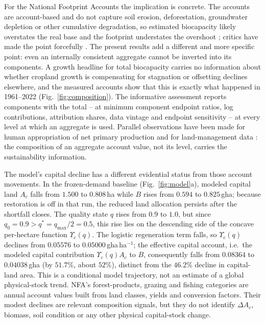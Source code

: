 \documentclass[preprint,12pt,authoryear]{elsarticle}
\newcommand{\Ups}{\Upsilon_c}
\begin{document}
For the National Footprint Accounts the implication is concrete. The accounts are account-based and do not capture soil erosion, deforestation, groundwater depletion or other cumulative degradation, so estimated biocapacity likely overstates the real base and the footprint understates the overshoot \citep{Wackernagel2002,Borucke2013}; critics have made the point forcefully \citep{Blomqvist2013,GiampietroSaltelli2014,Galli2016,vdBerghGrazi2015}. The present results add a different and more specific point: even an internally consistent aggregate cannot be inverted into its components. A growth headline for total biocapacity carries no information about whether cropland growth is compensating for stagnation or offsetting declines elsewhere, and the measured accounts show that this is exactly what happened in 1961--2022 (Fig.~\ref{fig:composition}). The informative assessment reports components with the total -- at minimum component endpoint ratios, log contributions, attribution shares, data vintage and endpoint sensitivity -- at every level at which an aggregate is used. Parallel observations have been made for human appropriation of net primary production and for land-management data \citep{Haberl2007,Krausmann2013,Erb2017,Carvalhais2014}: the composition of an aggregate account value, not its level, carries the sustainability information.

The model's capital decline has a different evidential status from those account movements. In the frozen-demand baseline (Fig.~\ref{fig:model}a), modeled capital land $A_c$ falls from $1.500$ to $0.808$\,ha while $B$ rises from $0.594$ to $0.825$\,gha; because restoration is off in that run, the reduced land allocation persists after the shortfall closes. The quality state $q$ rises from $0.9$ to $1.0$, but since $q_0=0.9>q^*=q_{\max}/2=0.5$, this rise lies on the descending side of the concave per-hectare function $\Ups(q)$. The logistic regeneration term falls, so $\Ups(q)$ declines from $0.05576$ to $0.05000$\,gha\,ha$^{-1}$; the effective capital account, i.e.\ the modeled capital contribution $\Ups(q)A_c$ to $B$, consequently falls from $0.08364$ to $0.04038$\,gha (by $51.7\%$, about $52\%$), distinct from the $46.2\%$ decline in capital-land area. This is a conditional model trajectory, not an estimate of a global physical-stock trend. NFA's forest-products, grazing and fishing categories are annual account values built from land classes, yields and conversion factors. Their modest declines are relevant composition signals, but they do not identify $\Delta A_c$, biomass, soil condition or any other physical capital-stock change.
\end{document}
